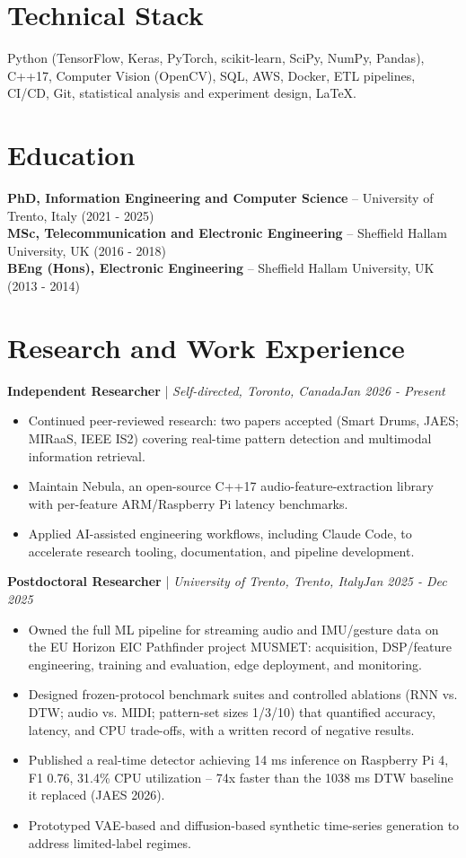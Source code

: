 \documentclass[11pt]{article}
\newenvironment{cvrole}[5]{%
  \par\noindent\textbf{\large #1} | \textit{\small #2, #3}\hfill \textit{\small #4 - #5}\par
  \begin{itemize}[leftmargin=2em, itemsep=-0.3em, topsep=-0.5em]%
}{%
  \end{itemize}\par\noindent\mbox{}\par\vspace{0.1em}%
}
\begin{document}
\section*{Technical Stack}
Python (TensorFlow, Keras, PyTorch, scikit-learn, SciPy, NumPy, Pandas), C++17, Computer Vision (OpenCV), SQL, AWS, Docker, ETL pipelines, CI/CD, Git, statistical analysis and experiment design, LaTeX.

\section*{Education}
\textbf{PhD, Information Engineering and Computer Science} -- University of Trento, Italy (2021 - 2025) \\
\textbf{MSc, Telecommunication and Electronic Engineering} -- Sheffield Hallam University, UK (2016 - 2018) \\
\textbf{BEng (Hons), Electronic Engineering} -- Sheffield Hallam University, UK (2013 - 2014)

\section*{Research and Work Experience}

\begin{cvrole}{Independent Researcher}{Self-directed}{Toronto, Canada}{Jan 2026}{Present}
\item Continued peer-reviewed research: two papers accepted (Smart Drums, JAES; MIRaaS, IEEE IS2) covering real-time pattern detection and multimodal information retrieval.
\item Maintain Nebula, an open-source C++17 audio-feature-extraction library with per-feature ARM/Raspberry Pi latency benchmarks.
\item Applied AI-assisted engineering workflows, including Claude Code, to accelerate research tooling, documentation, and pipeline development.
\end{cvrole}

\begin{cvrole}{Postdoctoral Researcher}{University of Trento}{Trento, Italy}{Jan 2025}{Dec 2025}
\item Owned the full ML pipeline for streaming audio and IMU/gesture data on the EU Horizon EIC Pathfinder project MUSMET: acquisition, DSP/feature engineering, training and evaluation, edge deployment, and monitoring.
\item Designed frozen-protocol benchmark suites and controlled ablations (RNN vs. DTW; audio vs. MIDI; pattern-set sizes 1/3/10) that quantified accuracy, latency, and CPU trade-offs, with a written record of negative results.
\item Published a real-time detector achieving 14 ms inference on Raspberry Pi 4, F1 0.76, 31.4\% CPU utilization -- 74x faster than the 1038 ms DTW baseline it replaced (JAES 2026).
\item Prototyped VAE-based and diffusion-based synthetic time-series generation to address limited-label regimes.
\end{cvrole}
\end{document}
